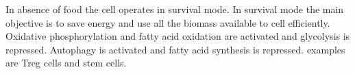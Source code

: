 In absence of food the cell operates in survival mode. In survival mode the main objective is to save energy and use all the biomass available to cell efficiently.
Oxidative phosphorylation and fatty acid oxidation are activated and glycolysis is repressed.
Autophagy is activated and fatty acid synthesis is repressed.
examples are Treg cells and stem cells.